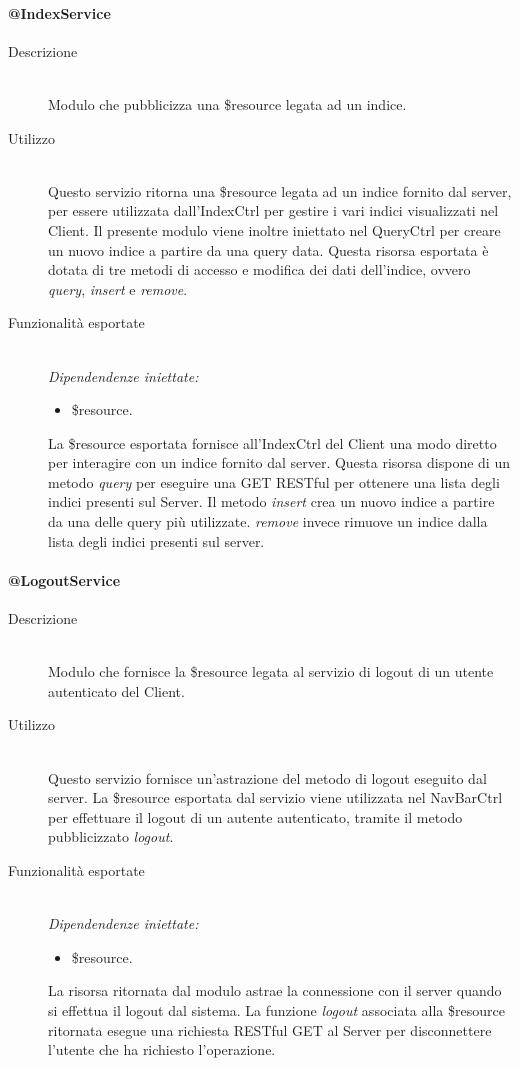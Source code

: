 \paragraph{@IndexService}
\begin{description}
 \item[Descrizione] \hfill \\
 Modulo che pubblicizza una \$resource legata ad un indice.
 \item[Utilizzo] \hfill \\
 Questo servizio ritorna una \$resource legata ad un indice fornito dal server, per essere utilizzata dall'IndexCtrl per gestire i vari 
 indici visualizzati nel Client. Il presente modulo viene inoltre iniettato nel QueryCtrl per creare un nuovo indice a partire da una 
 query data. Questa risorsa esportata è dotata di tre metodi di accesso e modifica dei dati dell'indice, ovvero
 \textit{query}, \textit{insert} e \textit{remove}.
 \item[Funzionalità esportate] \hfill \\
 \emph{Dipendendenze iniettate:}
 \begin{itemize}
  \item \$resource.
 \end{itemize}
 La \$resource esportata fornisce all'IndexCtrl del Client una modo diretto per interagire con un indice fornito dal server. Questa 
 risorsa dispone di un metodo \textit{query} per eseguire una GET RESTful per ottenere una lista degli indici presenti sul Server.
 Il metodo \textit{insert} crea un nuovo indice a partire da una delle query più utilizzate. \textit{remove} invece rimuove un indice
 dalla lista degli indici presenti sul server.
\end{description}

\paragraph{@LogoutService}
\begin{description}
 \item[Descrizione] \hfill \\
 Modulo che fornisce la \$resource legata al servizio di logout di un utente autenticato del Client.
 \item[Utilizzo] \hfill \\
  Questo servizio fornisce un'astrazione del metodo di logout eseguito dal server. La \$resource esportata dal servizio viene utilizzata
  nel NavBarCtrl per effettuare il logout di un autente autenticato, tramite il metodo pubblicizzato \textit{logout}. 
 \item[Funzionalità esportate] \hfill \\
 \emph{Dipendendenze iniettate:}
 \begin{itemize}
  \item \$resource.
 \end{itemize}
 La risorsa ritornata dal modulo astrae la connessione con il server quando si effettua il logout dal sistema. La funzione \textit{logout} 
 associata alla \$resource ritornata esegue una richiesta RESTful GET al Server per disconnettere l'utente che ha richiesto l'operazione.
\end{description}

